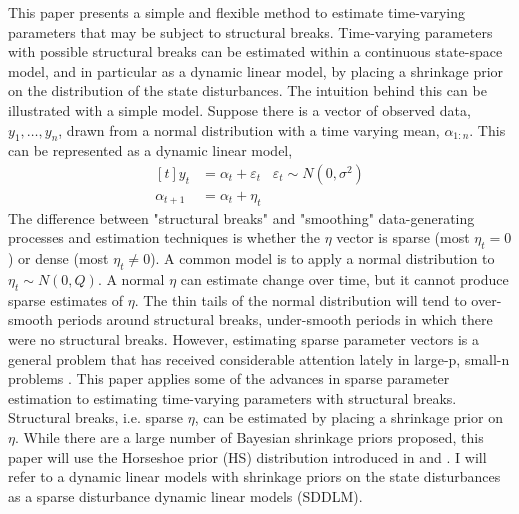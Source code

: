 \documentclass{article}
\begin{document}
This paper presents a simple and flexible method to estimate time-varying parameters that may be subject to structural breaks.
Time-varying parameters with possible structural breaks can be estimated within a continuous state-space model, and in particular as a dynamic linear model, by placing a shrinkage prior on the distribution of the state disturbances.
The intuition behind this can be illustrated with a simple model.
Suppose there is a vector of observed data, $y_{1}, \dots, y_{n}$, drawn from a normal distribution with a time varying mean, $\alpha_{1:n}$. 
This can be represented as a dynamic linear model,
\begin{equation}
  \label{eq:4}
  \begin{aligned}[t]
    y_{t} &= \alpha_{t} + \varepsilon_{t} & \varepsilon_{t} \sim N(0, \sigma^{2}) \\
    \alpha_{t + 1} &= \alpha_{t} + \eta_{t}
  \end{aligned}
\end{equation}
The difference between "structural breaks" and "smoothing" data-generating processes and estimation techniques is whether the $\eta$ vector is sparse (most $\eta_{t} = 0$) or dense (most $\eta_{t} \neq 0$).
A common model is to apply a normal distribution to $\eta_{t} \sim N(0, Q)$.
A normal $\eta$ can estimate change over time, but it cannot produce sparse estimates of $\eta$.
The thin tails of the normal distribution will tend to over-smooth periods around structural breaks, under-smooth periods in which there were no structural breaks.
However, estimating sparse parameter vectors is a general problem that has received considerable attention lately in large-p, small-n problems \parencites{Tibshirani1996}{PolsonScott2010}.
This paper applies some of the advances in sparse parameter estimation to estimating time-varying parameters with structural breaks.
Structural breaks, i.e. sparse $\eta$, can be estimated by placing a shrinkage prior on $\eta$.
While there are a large number of Bayesian shrinkage priors proposed, this paper will use the Horseshoe prior (HS) distribution introduced in \textcites{CarvalhoPolsonScott2009} and \textcite{CarvalhoPolsonScott2010}.
I will refer to a dynamic linear models with shrinkage priors on the state disturbances as a sparse disturbance dynamic linear models (SDDLM).
\end{document}
